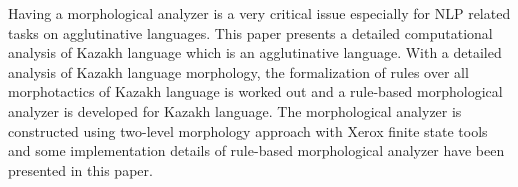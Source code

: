 Having a morphological analyzer is a very critical issue especially for NLP related tasks on agglutinative languages. This paper presents a detailed computational analysis of Kazakh language which is an agglutinative language. With a detailed analysis of Kazakh language morphology, the formalization of rules over all morphotactics of Kazakh language is worked out and a rule-based morphological analyzer is developed for Kazakh language. The morphological analyzer is constructed using two-level morphology approach with Xerox finite state tools and some implementation details of rule-based morphological analyzer have been presented in this paper.
